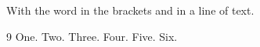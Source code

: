 \documentclass{article}
\begin{document}
With the word in the brackets \cite{a,c,e} and \cite[p.~2]{b} in a line of text.

\begin{thebibliography}{9}
 One.
 Two.
 Three.
 Four.
 Five.
 Six.
\end{thebibliography}
\end{document}
